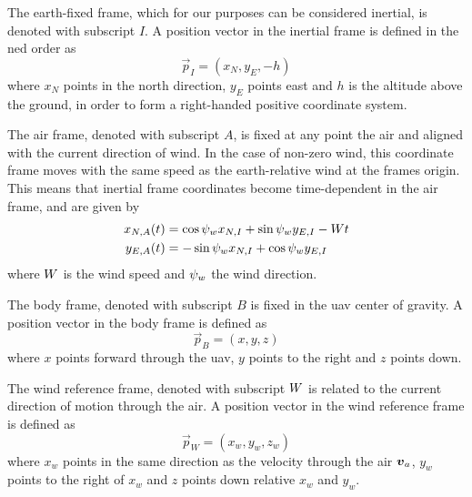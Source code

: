 \begin{definition}
    The earth-fixed frame, which for our purposes can be considered inertial, is denoted with subscript $I$.
    A position vector in the inertial frame is defined in the \ac{ned} order as
    \begin{equation}
        \vec{p}_I = (x_N, y_E, -h)
    \end{equation}
    where $x_N$ points in the north direction, $y_E$ points east and $h$ is the altitude above the ground,
    in order to form a right-handed positive coordinate system.
\end{definition}

\begin{definition}
    The air frame, denoted with subscript $A$, is fixed at any point the air and aligned with the current direction of wind. In the case of non-zero wind,
    this coordinate frame moves with the same speed as the earth-relative wind at the frames origin.
    This means that inertial frame coordinates become time-dependent in the air frame, and are given by
    \begin{align}
        x_{N,A}(t) &= \cos\psi_w x_{N,I} + \sin\psi_w y_{E,I} - Wt\\
        y_{E,A}(t) &= -\sin\psi_w x_{N,I} + \cos\psi_w y_{E,I}
    \end{align}
    where $W$ is the wind speed and $\psi_w$ the wind direction.
\end{definition}

\begin{definition}
    The body frame, denoted with subscript $B$ is fixed in the \ac{uav} center of gravity.
    A position vector in the body frame is defined as
    \begin{equation}
        \vec{p}_B = (x, y, z)
    \end{equation}
    where $x$ points forward through the \ac{uav}, $y$ points to the right and $z$ points down.
\end{definition}

\begin{definition}
    The wind reference frame, denoted with subscript $W$ is related to the current direction of motion
    through the air.
    A position vector in the wind reference frame is defined as
    \begin{equation}
        \vec{p}_W = (x_w, y_w, z_w)
    \end{equation}
    where $x_w$ points in the same direction as the velocity through the air $\boldsymbol{v}_a$, 
    $y_w$ points to the right of $x_w$ and $z$ points down relative $x_w$ and $y_w$.
\end{definition}

